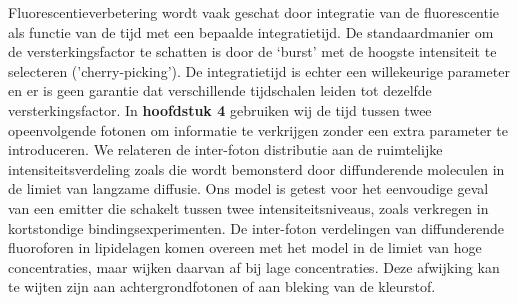Fluorescentieverbetering wordt vaak geschat door integratie van de fluorescentie als functie van de tijd met een bepaalde integratietijd. De standaardmanier om de versterkingsfactor te schatten is door de ‘burst’ met de hoogste intensiteit te selecteren ('cherry-picking'). De integratietijd is echter een willekeurige parameter en er is geen garantie dat verschillende tijdschalen leiden tot dezelfde versterkingsfactor. In \textbf{hoofdstuk 4} gebruiken wij  de tijd  tussen twee opeenvolgende fotonen  om informatie te verkrijgen zonder een extra parameter te introduceren. We relateren de inter-foton distributie aan de ruimtelijke intensiteitsverdeling zoals die wordt bemonsterd door diffunderende moleculen in de limiet van langzame diffusie. Ons model is getest voor het eenvoudige geval van een emitter die schakelt tussen twee intensiteitsniveaus, zoals verkregen in kortstondige bindingsexperimenten. De inter-foton verdelingen van diffunderende fluoroforen in lipidelagen komen overeen met het model in de limiet van hoge concentraties, maar wijken daarvan af bij lage concentraties. Deze afwijking kan te wijten zijn aan achtergrondfotonen of aan bleking van de kleurstof.


